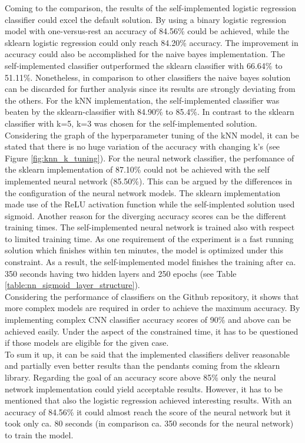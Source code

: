 \documentclass[11pt,a4paper]{article}
\begin{document}
\noindent Coming to the comparison, the results of the self-implemented logistic regression classifier could excel the default solution. By using a binary logistic regression model with one-versus-rest an accuracy of 84.56\% could be achieved, while the sklearn logistic regression could only reach 84.20\% accuracy. The improvement in accuracy could also be accomplished for the naive bayes implementation. The self-implemented classifier outperformed the sklearn classifier with 66.64\% to 51.11\%. Nonetheless, in comparison to other classifiers the naive bayes solution can be discarded for further analysis since its results are strongly deviating from the others. For the kNN implementation, the self-implemented classifier was beaten by the sklearn-classifier with 84.90\% to 85.4\%. In contrast to the sklearn classifier with k=5, k=3 was chosen for the self-implemented solution. Considering the graph of the hyperparameter tuning of the kNN model, it can be stated that there is no huge variation of the accuracy with changing k's (see Figure \ref{fig:knn_k_tuning}). For the neural network classifier, the perfomance of the sklearn implementation of 87.10\% could not be achieved with the self implemented neural network (85.50\%). This can be argued by the differences in the configuration of the neural network models. The sklearn implementation made use of the ReLU activation function while the self-implented solution used sigmoid. Another reason for the diverging accuracy scores can be the different training times. The self-implemented neural network is trained also with respect to limited training time. As one requirement of the experiment is a fast running solution which finishes within ten minutes, the model is optimized under this constraint. As a result, the self-implemented model finishes the training after ca. 350 seconds having two hidden layers and 250 epochs (see Table \ref{table:nn_sigmoid_layer_structure}).\\

\noindent Considering the performance of classifiers on the Github repository\cite{web:fashion_mnist_benchmarks}, it shows that more complex models are required in order to achieve the maximum accuracy. By implementing complex CNN classifier accuracy scores of 90\% and above can be achieved easily. Under the aspect of the constrained time, it has to be questioned if those models are eligible for the given case.\\

\noindent To sum it up, it can be said that the implemented classifiers deliver reasonable and partially even better results than the pendants coming from the sklearn library. Regarding the goal of an accuracy score above 85\% only the neural network implementation could yield acceptable results. However, it has to be mentioned that also the logistic regression achieved interesting results. With an accuracy of 84.56\% it could almost reach the score of the neural network but it took only ca. 80 seconds (in comparison ca. 350 seconds for the neural network) to train the model.\\
\end{document}
